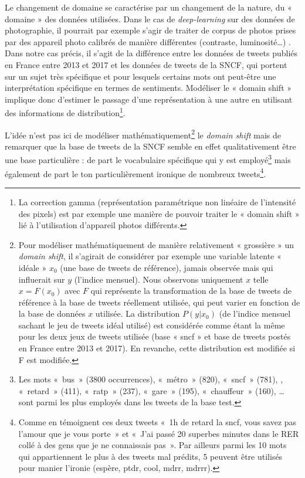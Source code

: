 \documentclass[11pt,french,french]{article}
\let\rmarkdownfootnote\footnote%
\def\footnote{\protect\rmarkdownfootnote}
\begin{document}
Le changement de domaine se caractérise par un changement de la nature, du « domaine » des données utilisées.
Dans le cas de \emph{deep-learning} sur des données de photographie, il pourrait par exemple s'agir de traiter de corpus de photos prises par des appareil photo calibrés de manière différentes (contraste, luminosité\ldots{}) .
Dans notre cas précis, il s'agit de la différence entre les données de tweets publiés en France entre 2013 et 2017 et les données de tweets de la SNCF, qui portent sur un sujet très spécifique et pour lesquels certains mots ont peut-être une interprétation spécifique en termes de sentiments.
Modéliser le « domain shift » implique donc d'estimer le passage d'une représentation à une autre en utilisant des informations de distribution\footnote{La correction gamma (représentation paramétrique non linéaire de l’intensité des pixels) est par exemple une manière de pouvoir traiter le « domain shift » lié à l’utilisation d’appareil photos différents.}.

L'idée n'est pas ici de modéliser mathématiquement\footnote{Pour modéliser mathématiquement de manière relativement « grossière » un \emph{domain shift}, il s'agirait de considérer par exemple une variable latente « idéale » \(x_0\) (une base de tweets de référence), jamais observée mais qui influerait sur \(y\) (l'indice mensuel). Nous observons uniquement \(x\) telle \(x=F(x_0)\) avec \(F\) qui représente la transformation de la base de tweets de référence à la base de tweets réellement utilisée, qui peut varier en fonction de la base de données \(x\) utilisée. La distribution \(P(y|x_0)\) (de l'indice mensuel sachant le jeu de tweets idéal utilisé) est considérée comme étant la même pour les deux jeux de tweets utilisée (base « sncf » et base de tweets postés en France entre 2013 et 2017). En revanche, cette distribution est modifiée si F est modifiée.} le \emph{domain shift} mais de remarquer que la base de tweets de la SNCF semble en effet qualitativement être une base particulière : de part le vocabulaire spécifique qui y est employé\footnote{Les mots «~bus~» (3800 occurrences), «~métro~» (820), «~sncf~» (781), , «~retard~» (411), «~ratp~» (237), «~gare~» (195), «~chauffeur~» (160), \ldots{} sont parmi les plus employés dans les tweets de la base test.} mais également de part le ton particulièrement ironique de nombreux tweets\footnote{Comme en témoignent ces deux tweets «~1h de retard la sncf, vous savez pas l'amour que je vous porte~» et «~J'ai passé 20 superbes minutes dans le RER collé à des gens que je ne connaissais pas~». Par ailleurs parmi les 10 mots qui appartiennent le plus à des tweets mal prédits, 5 peuvent être utilisés pour manier l'ironie (espère, ptdr, cool, mdrr, mdrrr).}.
\end{document}
